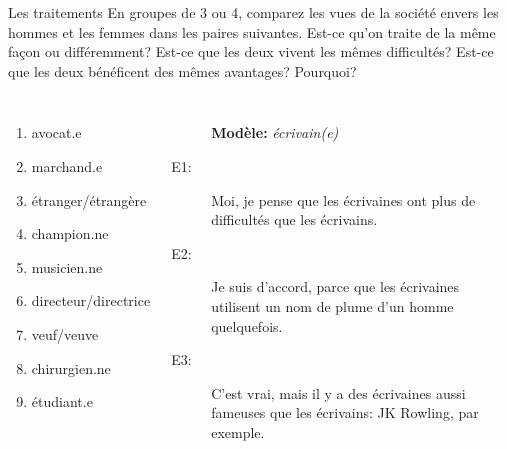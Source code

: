 \begin{frame}{Les traitements}
  \small
  En groupes de 3 ou 4, comparez les vues de la société envers les hommes et les femmes dans les paires suivantes.
  Est-ce qu'on traite de la même façon ou différemment?
  Est-ce que les deux vivent  les mêmes difficultés?
  Est-ce que les deux bénéficent des mêmes avantages?
  Pourquoi?
  \begin{columns}
    \small
      \begin{enumerate}
        \item avocat.e
        \item marchand.e
        \item étranger/étrangère
        \item champion.ne
        \item musicien.ne
        \item directeur/directrice
        \item veuf/veuve
        \item chirurgien.ne
        \item étudiant.e
      \end{enumerate}
      \begin{description}
        \item[] \textbf{Modèle:} \emph{écrivain(e)}
        \item[E1:] Moi, je pense que les écrivaines ont plus de difficultés que les écrivains.
        \item[E2:] Je suis d'accord, parce que les écrivaines utilisent un nom de plume d'un homme quelquefois.
        \item[E3:] C'est vrai, mais il y a des écrivaines aussi fameuses que les écrivains: JK Rowling, par exemple.
      \end{description}
  \end{columns}
\end{frame}